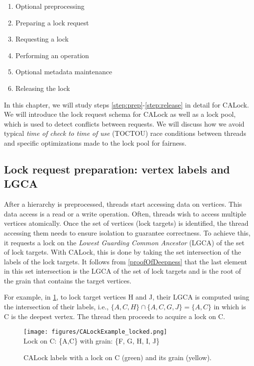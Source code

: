 \begin{enumerate}
	\item Optional preprocessing
	\item Preparing a lock request \label{step:prep}
	\item Requesting a lock
	\item Performing an operation
	\item Optional metadata maintenance
	\item Releasing the lock \label{step:release}
\end{enumerate}

In this chapter, we will study steps \ref{step:prep}-\ref{step:release} in detail for CALock. We will introduce the lock request schema for CALock as well as a lock pool, which is used to detect conflicts between requests. We will discuss how we avoid typical \emph{time of check to time of use} (TOCTOU) race conditions between threads and specific optimizations made to the lock pool for fairness.


\subsection{Lock request preparation: vertex labels and LGCA}

After a hierarchy is preprocessed, threads start accessing data on vertices. This data access is a read or a write operation. Often, threads wish to access multiple vertices atomically. Once the set of vertices (lock targets) is identified, the thread accessing them needs to ensure isolation to guarantee correctness. To achieve this, it requests a lock on the \emph{Lowest Guarding Common Ancestor} (LGCA) of the set of lock targets. With CALock, this is done by taking the set intersection of the labels of the lock targets. It follows from \cref{proofOfDeepness} that the last element in this set intersection is the LGCA of the set of lock targets and is the root of the grain that contains the target vertices. 

For example, in \cref{calockexample}, to lock target vertices H and J, their LGCA is computed using the intersection of their labels, i.e., $\{A, C, H\} \cap \{A, C, G, J\} =  \{A,C\}$ in which is C is the deepest vertex. The thread then proceeds to acquire a lock on C. 


\begin{figure}[h]
	\centering
	\captionsetup{justification=centering}
	\texttt{[image: figures/CALockExample\_locked.png]}\\
	{\small
		Lock on C: \{A,C\} with grain: \{F, G, H, I, J\}
	}
	\caption{CALock labels with a lock on C (green) and its grain (yellow).}
	\label{calockexample}
\end{figure}

